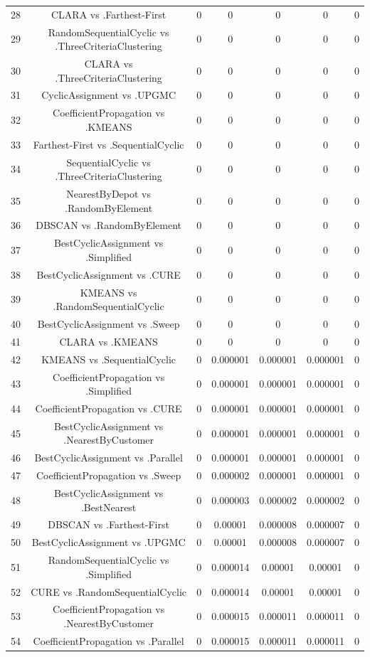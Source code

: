 \documentclass[a4paper,10pt]{article}
\begin{document}
\begin{landscape}
\begin{table}[!htp]
\begin{tabular}{ccccccc}
28&CLARA vs .Farthest-First&0&0&0&0&0\\
29&RandomSequentialCyclic vs .ThreeCriteriaClustering&0&0&0&0&0\\
30&CLARA vs .ThreeCriteriaClustering&0&0&0&0&0\\
31&CyclicAssignment vs .UPGMC&0&0&0&0&0\\
32&CoefficientPropagation vs .KMEANS&0&0&0&0&0\\
33&Farthest-First vs .SequentialCyclic&0&0&0&0&0\\
34&SequentialCyclic vs .ThreeCriteriaClustering&0&0&0&0&0\\
35&NearestByDepot vs .RandomByElement&0&0&0&0&0\\
36&DBSCAN vs .RandomByElement&0&0&0&0&0\\
37&BestCyclicAssignment vs .Simplified&0&0&0&0&0\\
38&BestCyclicAssignment vs .CURE&0&0&0&0&0\\
39&KMEANS vs .RandomSequentialCyclic&0&0&0&0&0\\
40&BestCyclicAssignment vs .Sweep&0&0&0&0&0\\
41&CLARA vs .KMEANS&0&0&0&0&0\\
42&KMEANS vs .SequentialCyclic&0&0.000001&0.000001&0.000001&0\\
43&CoefficientPropagation vs .Simplified&0&0.000001&0.000001&0.000001&0\\
44&CoefficientPropagation vs .CURE&0&0.000001&0.000001&0.000001&0\\
45&BestCyclicAssignment vs .NearestByCustomer&0&0.000001&0.000001&0.000001&0\\
46&BestCyclicAssignment vs .Parallel&0&0.000001&0.000001&0.000001&0\\
47&CoefficientPropagation vs .Sweep&0&0.000002&0.000001&0.000001&0\\
48&BestCyclicAssignment vs .BestNearest&0&0.000003&0.000002&0.000002&0\\
49&DBSCAN vs .Farthest-First&0&0.00001&0.000008&0.000007&0\\
50&BestCyclicAssignment vs .UPGMC&0&0.00001&0.000008&0.000007&0\\
51&RandomSequentialCyclic vs .Simplified&0&0.000014&0.00001&0.00001&0\\
52&CURE vs .RandomSequentialCyclic&0&0.000014&0.00001&0.00001&0\\
53&CoefficientPropagation vs .NearestByCustomer&0&0.000015&0.000011&0.000011&0\\
54&CoefficientPropagation vs .Parallel&0&0.000015&0.000011&0.000011&0\\

\end{tabular}
\end{table}
\end{landscape}
\end{document}
